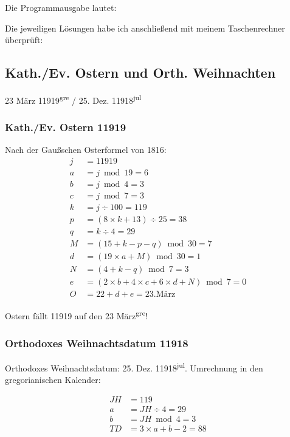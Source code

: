 Die Programmausgabe lautet:


Die jeweiligen Lösungen habe ich anschließend mit meinem Taschenrechner überprüft:

	\twocolumn
	\subsection{Kath./Ev. Ostern und Orth. Weihnachten}
		23 März 11919\textsuperscript{gre} / 25. Dez. 11918\textsuperscript{jul}
		\subsubsection{Kath./Ev. Ostern 11919}
			Nach der Gaußschen Osterformel von 1816:
			\begin{align*}
			j &= 11919													\\
			a &= j \bmod 19 = 6											\\
			b &= j \bmod 4 = 3											\\
			c &= j \bmod 7 = 3											\\
			k &= j \div 100 = 119										\\
			p &= (8 \times k + 13) \div 25 = 38							\\
			q &= k \div 4 = 29											\\
			M &= (15 + k - p -q) \bmod 30 = 7							\\
			d &= (19 \times a + M) \bmod 30 = 1							\\
			N &= (4 + k - q) \bmod 7 = 3									\\
			e &= (2 \times b + 4 \times c + 6 \times d + N) \bmod 7 = 0	\\
			O &= 22 + d + e = 23 \text{.März}						
			\end{align*}

			Ostern fällt 11919 auf den 23 März\textsuperscript{gre}!
		\subsubsection{Orthodoxes Weihnachtsdatum 11918}
			Orthodoxes Weihnachtsdatum: 25. Dez. 11918\textsuperscript{jul}. Umrechnung in den gregorianischen Kalender:

			\begin{align*}
			JH &= 119						\\
			a &= JH \div 4 = 29				\\
			b &= JH \bmod 4 = 3				\\
			TD &= 3 \times a + b - 2 = 88 	\\
			\end{align*}

